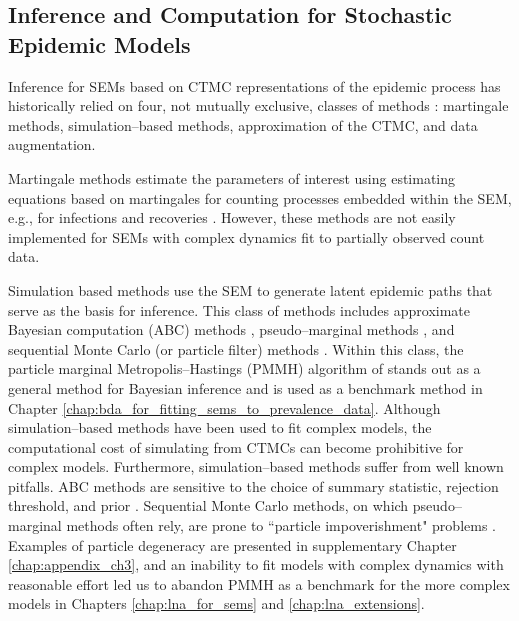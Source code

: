 \subsection{Inference and Computation for Stochastic Epidemic Models}
\label{subsec:sem_exact_inf}
Inference for SEMs based on CTMC representations of the epidemic process has historically relied on four, not mutually exclusive, classes of methods \cite{oneill2010}: martingale methods, simulation--based methods, approximation of the CTMC, and data augmentation. 

Martingale methods estimate the parameters of interest using estimating equations based on martingales for counting processes embedded within the SEM, e.g., for infections and recoveries \citep{andersson2000stochastic,becker1977general,lau2008estimating, lindenstrand2013estimation,sudbury1985proportion}. However, these methods are not easily implemented for SEMs with complex dynamics fit to partially observed count data.

Simulation based methods use the SEM to generate latent epidemic paths that serve as the basis for inference. This class of methods includes approximate Bayesian computation (ABC) methods \citep{mckinley2009,toni2009,mckinley2018approximate}, pseudo--marginal methods \citep{mckinley2014simulation,shubin2016revealing}, and sequential Monte Carlo (or particle filter) methods \cite{andrieu2010particle, dukic2012,golightly2018efficient,ionides2011iterated,koepke2016predictive,toni2009}. Within this class, the particle marginal Metropolis--Hastings (PMMH) algorithm of \cite{andrieu2010particle} stands out as a general method for Bayesian inference and is used as a benchmark method in Chapter \ref{chap:bda_for_fitting_sems_to_prevalence_data}. Although simulation--based methods have been used to fit complex models, the computational cost of simulating from CTMCs can become prohibitive for complex models. Furthermore, simulation--based methods suffer from well known pitfalls. ABC methods are sensitive to the choice of summary statistic, rejection threshold, and prior  \cite{toni2009}. Sequential Monte Carlo methods, on which pseudo--marginal methods often rely, are prone to ``particle impoverishment" problems \cite{cappe2006inference, dukic2012}. Examples of particle degeneracy are presented in supplementary Chapter \ref{chap:appendix_ch3}, and an inability to fit models  with complex dynamics with reasonable effort led us to abandon PMMH as a benchmark for the more complex models in Chapters \ref{chap:lna_for_sems} and \ref{chap:lna_extensions}. 

